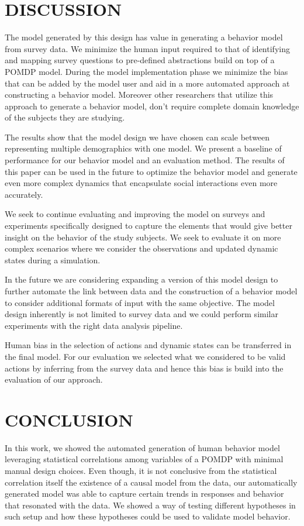 {\section{DISCUSSION}

The model generated by this design has value in generating a behavior model from  survey data. We minimize the human input required to that of identifying and mapping survey questions to pre-defined abstractions build on top of a POMDP model. During the model implementation phase we minimize the bias that can be added by the model user and aid in a more automated approach at constructing a behavior model. Moreover other researchers that utilize this approach to generate a behavior model, don't require complete domain knowledge of the subjects they are studying. 

The results show that the model design we have chosen can scale between representing multiple demographics with one model. We present a baseline of performance for our behavior model and an evaluation method. The results of this paper can be used in the future to optimize the behavior model and generate even more complex dynamics that encapsulate social interactions even more accurately.

We seek to continue evaluating and improving the model on surveys and experiments specifically designed to capture the elements that would give better insight on the behavior of the study subjects. We seek to evaluate it on more complex scenarios where we consider the observations and updated dynamic states during a simulation. 

In the future we are considering expanding a version of this model design to further automate the link between data and the construction of a behavior model to consider additional formats of input with the same objective. The model design inherently is not limited to survey data and we could perform similar experiments with the right data analysis pipeline. 
 
Human bias in the selection of actions and dynamic states can be transferred in the final model. For our evaluation we selected what we considered to be valid actions by inferring from the survey data and hence this bias is build into the evaluation of our approach. 


\section{CONCLUSION}
In this work, we showed the automated generation of human behavior model leveraging statistical correlations among variables of a POMDP with minimal manual design choices. Even though, it is not conclusive from the statistical correlation itself the existence of a causal model from the data, our automatically generated model was able to capture certain  trends in responses and behavior that resonated with the data. We showed a way of testing different hypotheses in such setup and how these hypotheses could be used to validate model behavior.

}
